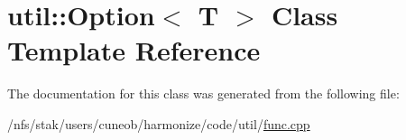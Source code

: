 \hypertarget{classutil_1_1Option}{\section{util\-:\-:Option$<$ T $>$ Class Template Reference}
\label{classutil_1_1Option}
}


The documentation for this class was generated from the following file\-:\begin{DoxyCompactItemize}
\item 
/nfs/stak/users/cuneob/harmonize/code/util/\hyperlink{func_8cpp}{func.\-cpp}\end{DoxyCompactItemize}
